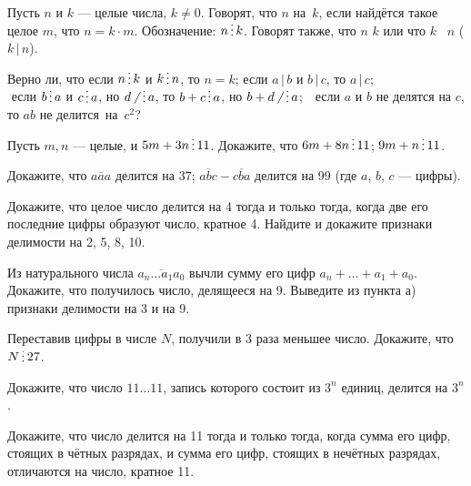 \documentclass[12pt,a4paper]{article}
\begin{document}





Пусть $n$ и $k$ --- целые числа, $k\ne0$. Говорят, что $n$ 
на~$k$, если найдётся такое целое $m$,
что $n=k\cdot m$. Обозначение: $n\del k$.
Говорят также, что $n$  $k$
или что $k$ ~$n$ ($k\,|\,n$).

 Верно ли, что
если $n\del k$ и $k\del n$, то $n=k$;
если $a\,|\,b$ и $b\,|\,c$, то $a\,|\,c$;\\
$\!\!$ если $b\del a$ и $c\del a$, но $d\!\not\,\,\del a$, то $b+c\del a$, но
$b+d\!\not\,\,\del a$; $\!\!$
$\!\!$ если $a$ и $b$ не делятся на $c$, то $ab$ не делится~на~$c^2$?

Пусть $m,n$ --- целые, и $5m+3n\del11$. Докажите, что  $6m+8n\del11$;   $9m+n\del11$.

Докажите, что
$\overline{aaa}$ делится на $37$; 
$\overline{abc}-\overline{cba}$ делится на 99 (где $a$, $b$, $c$ --- цифры).

 Докажите, что целое число делится на 4 тогда и только тогда,
когда две его последние цифры образуют число, кратное 4.
 Найдите и докажите признаки делимости на 2, 5, 8, 10.

Из натурального числа $\overline{a_n\ldots a_1a_0}$ вычли сумму
его цифр $a_n+\ldots+a_1+a_0$. Докажите, что получилось число,
делящееся на 9. 
Выведите из пункта а) признаки делимости на 3 и на 9.

Переставив цифры в числе $N$, получили в 3 раза меньшее число. Докажите, что $N\del27$.

Докажите, что число $11\dots11$, запись которого состоит из $3^n$ единиц,
делится на $3^n$.

Докажите, что число делится на 11 тогда и только тогда, когда
сумма его цифр, стоящих в чётных разрядах, и сумма его цифр, стоящих в нечётных разрядах, отличаются на число, кратное 11.
\end{document}

